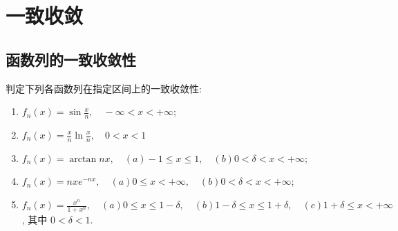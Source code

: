 \chapter{一致收敛}
\section{函数列的一致收敛性}
\begin{problem}
    判定下列各函数列在指定区间上的一致收敛性:
    \begin{enumerate}
        \item \(f_n(x) = \sin \frac{x}{n}, \quad -\infty <
            x < +\infty\);
        \item \(f_n(x) = \frac{x}{n} \ln \frac{x}{n}, \quad
            0 < x < 1\)
        \item \(f_n(x) = \arctan nx, \quad (a) - 1 \leq x
                \leq 1, \quad (b) 0 <
            \delta < x < +\infty\);
        \item \(f_n(x) = nxe^{-nx}, \quad (a) 0 \leq x <
                +\infty, \quad (b) 0 <
            \delta < x < +\infty\);
        \item \(f_n(x) = \frac{x^n}{1 + x^n}, \quad (a) 0
                \leq x \leq 1 -
                \delta, \quad (b) 1 - \delta \leq x \leq 1 + \delta,
            \quad (c) 1 + \delta \leq x < +\infty\), 其中 \(0 <
            \delta < 1\).
    \end{enumerate}
\end{problem}

